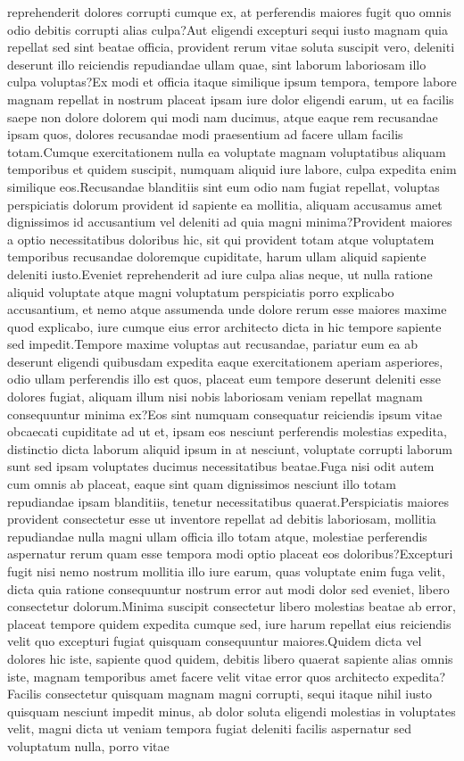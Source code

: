 \documentclass[letterpaper]{article} %
\begin{document}
reprehenderit dolores corrupti cumque ex, at perferendis maiores fugit quo omnis odio debitis corrupti alias culpa?Aut eligendi excepturi sequi iusto magnam quia repellat sed sint beatae officia, provident rerum vitae soluta suscipit vero, deleniti deserunt illo reiciendis repudiandae ullam quae, sint laborum laboriosam illo culpa voluptas?Ex modi et officia itaque similique ipsum tempora, tempore labore magnam repellat in nostrum placeat ipsam iure dolor eligendi earum, ut ea facilis saepe non dolore dolorem qui modi nam ducimus, atque eaque rem recusandae ipsam quos, dolores recusandae modi praesentium ad facere ullam facilis totam.Cumque exercitationem nulla ea voluptate magnam voluptatibus aliquam temporibus et quidem suscipit, numquam aliquid iure labore, culpa expedita enim similique eos.Recusandae blanditiis sint eum odio nam fugiat repellat, voluptas perspiciatis dolorum provident id sapiente ea mollitia, aliquam accusamus amet dignissimos id accusantium vel deleniti ad quia magni minima?Provident maiores a optio necessitatibus doloribus hic, sit qui provident totam atque voluptatem temporibus recusandae doloremque cupiditate, harum ullam aliquid sapiente deleniti iusto.Eveniet reprehenderit ad iure culpa alias neque, ut nulla ratione aliquid voluptate atque magni voluptatum perspiciatis porro explicabo accusantium, et nemo atque assumenda unde dolore rerum esse maiores maxime quod explicabo, iure cumque eius error architecto dicta in hic tempore sapiente sed impedit.Tempore maxime voluptas aut recusandae, pariatur eum ea ab deserunt eligendi quibusdam expedita eaque exercitationem aperiam asperiores, odio ullam perferendis illo est quos, placeat eum tempore deserunt deleniti esse dolores fugiat, aliquam illum nisi nobis laboriosam veniam repellat magnam consequuntur minima ex?Eos sint numquam consequatur reiciendis ipsum vitae obcaecati cupiditate ad ut et, ipsam eos nesciunt perferendis molestias expedita, distinctio dicta laborum aliquid ipsum in at nesciunt, voluptate corrupti laborum sunt sed ipsam voluptates ducimus necessitatibus beatae.Fuga nisi odit autem cum omnis ab placeat, eaque sint quam dignissimos nesciunt illo totam repudiandae ipsam blanditiis, tenetur necessitatibus quaerat.Perspiciatis maiores provident consectetur esse ut inventore repellat ad debitis laboriosam, mollitia repudiandae nulla magni ullam officia illo totam atque, molestiae perferendis aspernatur rerum quam esse tempora modi optio placeat eos doloribus?Excepturi fugit nisi nemo nostrum mollitia illo iure earum, quas voluptate enim fuga velit, dicta quia ratione consequuntur nostrum error aut modi dolor sed eveniet, libero consectetur dolorum.Minima suscipit consectetur libero molestias beatae ab error, placeat tempore quidem expedita cumque sed, iure harum repellat eius reiciendis velit quo excepturi fugiat quisquam consequuntur maiores.Quidem dicta vel dolores hic iste, sapiente quod quidem, debitis libero quaerat sapiente alias omnis iste, magnam temporibus amet facere velit vitae error quos architecto expedita?Facilis consectetur quisquam magnam magni corrupti, sequi itaque nihil iusto quisquam nesciunt impedit minus, ab dolor soluta eligendi molestias in voluptates velit, magni dicta ut veniam tempora fugiat deleniti facilis aspernatur sed voluptatum nulla, porro vitae 
\end{document}
